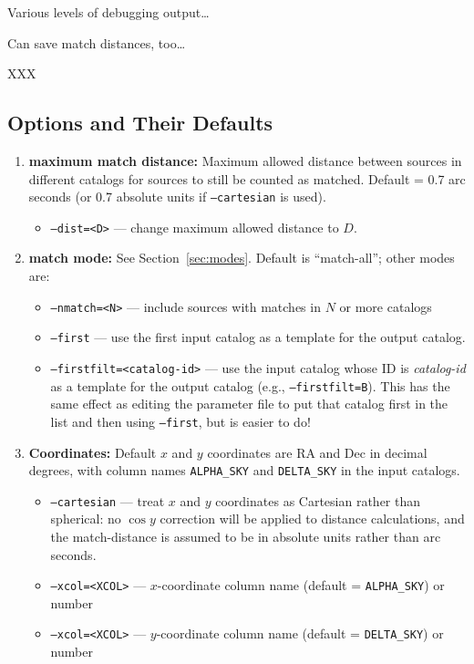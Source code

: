 \documentclass[10pt]{article}
\begin{document}
Various levels of debugging output\ldots

Can save match distances, too\ldots

XXX


\subsection{Options and Their Defaults}

\begin{enumerate}
  \item \textbf{maximum match distance:} Maximum allowed distance between 
  sources in different catalogs for sources to still be counted as 
  matched.  Default = 0.7 arc seconds (or 0.7 absolute units if 
  \texttt{--cartesian} is used).
  \begin{itemize}
    \item \texttt{--dist=<D>} --- change maximum allowed distance to 
    $D$.
  \end{itemize}
  
  \item \textbf{match mode:} See Section~\ref{sec:modes}.  Default is 
  ``match-all''; other modes are:
  \begin{itemize}
    \item \texttt{--nmatch=<N>} --- include sources with matches in 
    $N$ or more catalogs
    \item \texttt{--first} --- use the first input catalog as a 
    template for the output catalog.
    \item \texttt{--firstfilt=<catalog-id>} --- use the input catalog
    whose ID is \textit{catalog-id} as a template for the output
    catalog (e.g., \texttt{--firstfilt=B}).  This has the same effect
    as editing the parameter file to put that catalog first in the 
    list and then using \texttt{--first}, but is easier to do!
  \end{itemize}
  
  \item \textbf{Coordinates:} Default $x$ and $y$ coordinates are RA
  and Dec in decimal degrees, with column names \texttt{ALPHA\_SKY}
  and \texttt{DELTA\_SKY} in the input catalogs.
  \begin{itemize}
    \item \texttt{--cartesian} --- treat $x$ and $y$ coordinates as 
    Cartesian rather than spherical: no $\cos y$ correction will be 
    applied to distance calculations, and the match-distance is 
    assumed to be in absolute units rather than arc seconds.
    \item \texttt{--xcol=<XCOL>} --- $x$-coordinate column name 
    (default = \texttt{ALPHA\_SKY}) or number
    \item \texttt{--xcol=<XCOL>} --- $y$-coordinate column name 
    (default = \texttt{DELTA\_SKY}) or number
  \end{itemize}
  
  
\end{enumerate}
\end{document}
